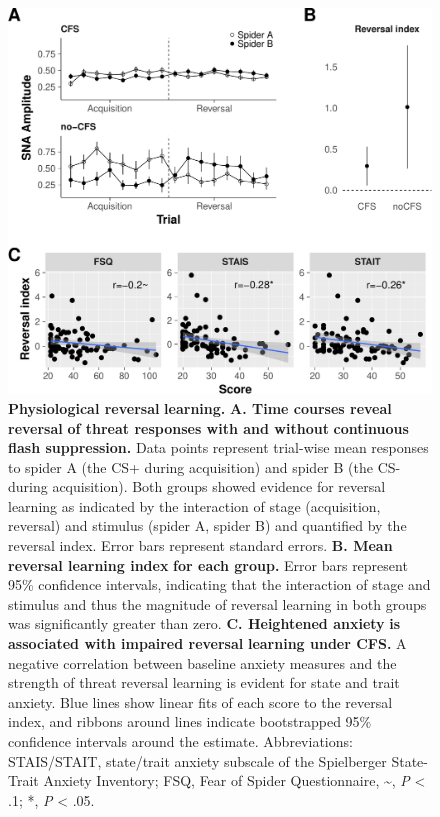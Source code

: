 \documentclass[12pt]{article}
\begin{document}
\clearpage
\begin{figure}[htbp]
\centering
\includegraphics[width=1.0\textwidth]{cfs_timecourses-crop.pdf}
\caption{\label{fig:org8bbee4d}
\textbf{Physiological reversal} \textbf{learning.} \textbf{A. Time courses reveal reversal} \textbf{of threat responses with and without} \textbf{continuous flash suppression.} Data points represent trial-wise mean responses to spider A (the CS+ during acquisition) and spider B (the CS- during acquisition). Both groups showed evidence for reversal learning as indicated by the interaction of stage (acquisition, reversal) and stimulus (spider A, spider B) and quantified by the reversal index. Error bars represent standard errors. \textbf{B. Mean reversal learning index} \textbf{for each group.} Error bars represent 95\% confidence intervals, indicating that the interaction of stage and stimulus and thus the magnitude of reversal learning in both groups was significantly greater than zero. \textbf{C. Heightened anxiety} \textbf{is associated with impaired reversal} \textbf{learning under CFS.} A negative correlation between baseline anxiety measures and the strength of threat reversal learning is evident for state and trait anxiety. Blue lines show linear fits of each score to the reversal index, and ribbons around lines indicate bootstrapped 95\% confidence intervals around the estimate. Abbreviations: STAIS/STAIT, state/trait anxiety subscale of the Spielberger State-Trait Anxiety Inventory; FSQ, Fear of Spider Questionnaire, \textasciitilde{}, \emph{P} < .1; *, \emph{P} < .05.}
\end{figure}
\end{document}
